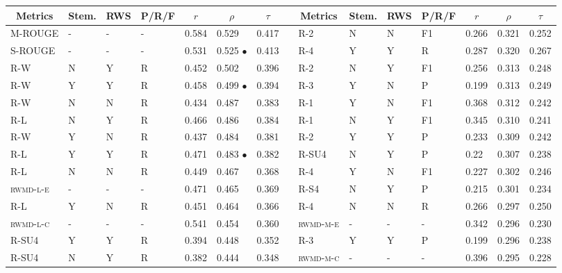 \documentclass[11pt,a4paper]{article}
\begin{document}
\begin{table}[]
{
\scriptsize
\centering
\begin{tabular}{lllllllllllllll}
\hline
\multicolumn{1}{c}{Metrics} & \multicolumn{1}{c}{Stem.} & \multicolumn{1}{c}{RWS} & \multicolumn{1}{c}{P/R/F} & \multicolumn{1}{c}{$r$} & \multicolumn{1}{c}{$\rho$} & \multicolumn{1}{c}{$\tau$} & \multicolumn{1}{c}{} & \multicolumn{1}{c}{Metrics} & \multicolumn{1}{c}{Stem.} & \multicolumn{1}{c}{RWS} & \multicolumn{1}{c}{P/R/F} & \multicolumn{1}{c}{$r$} & \multicolumn{1}{c}{$\rho$} & \multicolumn{1}{c}{$\tau$} \\ \hline
\textsc{M-ROUGE} & - & - & - & 0.584 & 0.529 & 0.417 &  & \textsc{R-2} & N & N & F1 & 0.266 & 0.321 & 0.252 \\
\textsc{S-ROUGE} & - & - & - & 0.531 & 0.525 $\bullet$ & 0.413 &  & \textsc{R-4} & Y & Y & R & 0.287 & 0.320 & 0.267 \\
\textsc{R-W} & N & Y & R & 0.452 & 0.502 & 0.396 &  & \textsc{R-2} & N & Y & F1 & 0.256 & 0.313 & 0.248 \\
\textsc{R-W} & Y & Y & R & 0.458 & 0.499 $\bullet$ & 0.394 &  & \textsc{R-3} & Y & N & P & 0.199 & 0.313 & 0.249 \\
\textsc{R-W} & N & N & R & 0.434 & 0.487 & 0.383 &  & \textsc{R-1} & Y & N & F1 & 0.368 & 0.312 & 0.242 \\
\textsc{R-L} & N & Y & R & 0.466 & 0.486 & 0.384 &  & \textsc{R-1} & N & Y & F1 & 0.345 & 0.310 & 0.241 \\
\textsc{R-W} & Y & N & R & 0.437 & 0.484 & 0.381 &  & \textsc{R-2} & Y & Y & P & 0.233 & 0.309 & 0.242 \\
\textsc{R-L} & Y & Y & R & 0.471 & 0.483 $\bullet$ & 0.382 &  & \textsc{R-SU4} & N & Y & P & 0.22 & 0.307 & 0.238 \\
\textsc{R-L} & N & N & R & 0.449 & 0.467 & 0.368 &  & \textsc{R-4} & Y & N & F1 & 0.227 & 0.302 & 0.246 \\
\textsc{rwmd-l-e} & - & - & - & 0.471 & 0.465 & 0.369 &  & \textsc{R-S4} & N & Y & P & 0.215 & 0.301 & 0.234 \\
\textsc{R-L} & Y & N & R & 0.451 & 0.464 & 0.366 &  & \textsc{R-4} & N & N & R & 0.266 & 0.297 & 0.250 \\
\textsc{rwmd-l-c} & - & - & - & 0.541 & 0.454 & 0.360 &  & \textsc{rwmd-m-e} & - & - & - & 0.342 & 0.296 & 0.230 \\
\textsc{R-SU4} & Y & Y & R & 0.394 & 0.448 & 0.352 &  & \textsc{R-3} & Y & Y & P & 0.199 & 0.296 & 0.238 \\
\textsc{R-SU4} & N & Y & R & 0.382 & 0.444 & 0.348 &  & \textsc{rwmd-m-c} & - & - & - & 0.396 & 0.295 & 0.228 \\

\end{tabular}}
\end{table}
\end{document}
